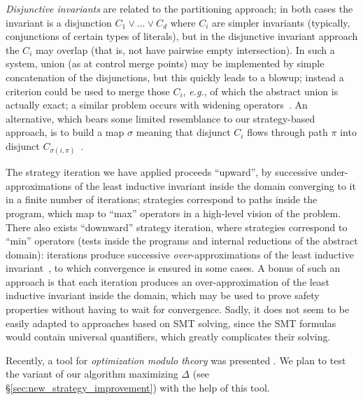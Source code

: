 \documentclass{llncs}
\newcommand{\pponly}[1]{}
\newcommand{\rronly}[1]{#1}
\newcommand{\eg}{\textit{e.g.}}
\begin{document}
\rronly{
\emph{Disjunctive invariants} are related to the partitioning
approach; in both cases the invariant is a disjunction $C_1 \lor \dots
\lor C_d$ where $C_i$ are simpler invariants (typically, conjunctions
of certain types of literals), but in the disjunctive invariant
approach the $C_i$ may overlap (that is, not have pairwise empty
intersection). In such a system, union (as at control merge points)
may be implemented by simple concatenation of the disjunctions, but
this quickly leads to a blowup; instead a criterion could be used to
merge those $C_i$, \eg, of which the abstract union is actually exact;
a similar problem occurs with widening
operators~\cite{DBLP:journals/sttt/BagnaraHZ06}. An alternative, which
bears some limited resemblance to our strategy-based approach, is to
build a map $\sigma$ meaning that disjunct $C_i$ flows through path
$\pi$ into disjunct
$C_{\sigma(i,\pi)}$~\cite{Henry_Monniaux_Moy_SAS2012}.
}

The strategy iteration we have applied proceeds ``upward'', by
successive under-approximations of the least inductive invariant\rronly{ inside the domain converging to it in a finite number of
  iterations}; strategies correspond to \rronly{paths inside the
  program, which map }to ``max'' operators in a high-level vision of
the problem. There also exists ``downward'' strategy iteration, where
strategies correspond to ``min'' operators\rronly{ (tests inside the
  programs and internal reductions of the abstract domain)}:
iterations produce successive \emph{over}-approximations of the least
inductive
invariant~\cite{DBLP:conf/esop/GaubertGTZ07,DBLP:conf/atva/SotinJVG11},
to which convergence is ensured in some cases. A bonus of such an
approach is that each iteration produces an over-approximation of the
least inductive invariant\rronly{ inside the domain}, which may be
used to prove safety properties without having to wait for
convergence. Sadly, it does not seem to be easily adapted to
approaches based on SMT solving, since the SMT formulas would contain
universal quantifiers\rronly{, which greatly complicates their solving}.

\pponly{For a more comprehensive discussion of related work, we refer to 
the extended version \cite{MS14a}.}
\rronly{
Recently, a tool for \emph{optimization modulo theory}
was presented \cite{LAK+14}. We plan to test the
variant of our algorithm maximizing $\Delta$ (see
\S\ref{sec:new_strategy_improvement}) with the help of this tool.
}

\pponly{\vspace*{-1.5ex}}
\end{document}
